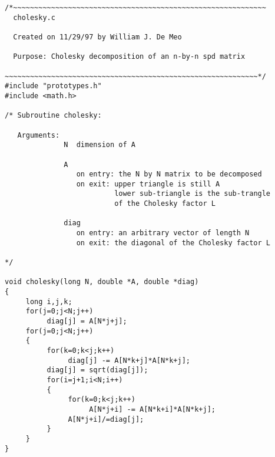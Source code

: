 \documentclass{article}
\begin{document}
\begin{verbatim}
/*~~~~~~~~~~~~~~~~~~~~~~~~~~~~~~~~~~~~~~~~~~~~~~~~~~~~~~~~~~~~
  cholesky.c

  Created on 11/29/97 by William J. De Meo

  Purpose: Cholesky decomposition of an n-by-n spd matrix 
           
~~~~~~~~~~~~~~~~~~~~~~~~~~~~~~~~~~~~~~~~~~~~~~~~~~~~~~~~~~~~*/
#include "prototypes.h"
#include <math.h>

/* Subroutine cholesky:

   Arguments: 
              N  dimension of A

              A 
                 on entry: the N by N matrix to be decomposed
                 on exit: upper triangle is still A
                          lower sub-triangle is the sub-trangle
                          of the Cholesky factor L

              diag 
                 on entry: an arbitrary vector of length N
                 on exit: the diagonal of the Cholesky factor L

*/

void cholesky(long N, double *A, double *diag)
{
     long i,j,k;
     for(j=0;j<N;j++)
          diag[j] = A[N*j+j];
     for(j=0;j<N;j++)
     {
          for(k=0;k<j;k++)
               diag[j] -= A[N*k+j]*A[N*k+j];
          diag[j] = sqrt(diag[j]);
          for(i=j+1;i<N;i++)
          {
               for(k=0;k<j;k++)
                    A[N*j+i] -= A[N*k+i]*A[N*k+j];
               A[N*j+i]/=diag[j];
          }
     }
}
\end{verbatim}
\end{document}

